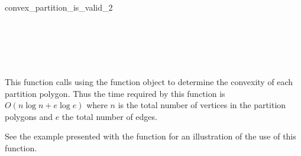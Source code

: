 \begin{ccRefFunction}{convex_partition_is_valid_2}
\ccSeeAlso

 \\
 \\
\\
 \\

\ccImplementation

This function calls  using the function object
 to determine the convexity of each partition polygon.
Thus the time required by this function is $O(n \log n + e \log e)$ where
$n$ is the total number of vertices in the partition polygons and $e$ the
total number of edges.

\ccExample

See the example presented with the function 
for an illustration of the use of this function.

\end{ccRefFunction}
\renewcommand\ccRefPageBegin{\ccParDims\cgalColumnLayout}
\renewcommand\ccRefPageEnd{\ccParDims\cgalColumnLayout}
